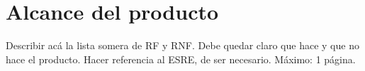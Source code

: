 \section{Alcance del producto}

Describir acá la lista somera de RF y RNF. 
Debe quedar claro que hace y que no hace el producto.
Hacer referencia al ESRE, de ser necesario.
Máximo: 1 página.
